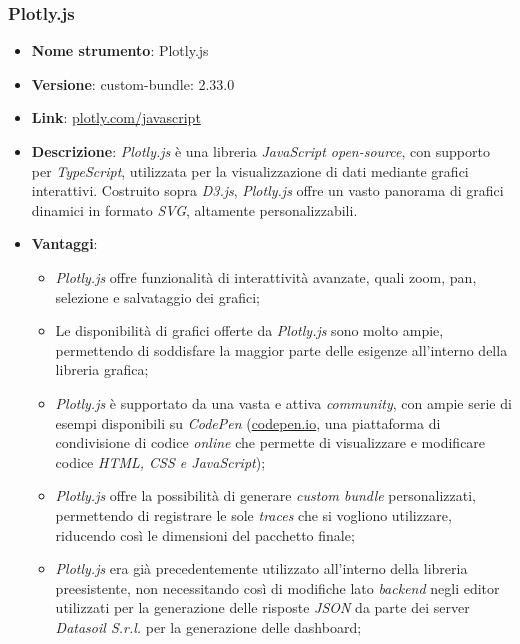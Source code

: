 \subsubsection{Plotly.js}
\begin{itemize}
    \item \textbf{Nome strumento}: Plotly.js
    \item \textbf{Versione}: custom-bundle: 2.33.0
    \item \textbf{Link}: \href{https://plotly.com/javascript/}{plotly.com/javascript}
    \item \textbf{Descrizione}: \textit{Plotly.js} è una libreria \textit{JavaScript open-source}, con supporto per \textit{TypeScript}, utilizzata per la visualizzazione di dati mediante grafici interattivi.
          Costruito sopra \textit{D3.js}, \textit{Plotly.js} offre un vasto panorama di grafici dinamici in formato \textit{\gls{SVG}\glox}, altamente personalizzabili.
    \item \textbf{Vantaggi}:
          \begin{itemize}
              \item \textit{Plotly.js} offre funzionalità di interattività avanzate, quali zoom, pan, selezione e salvataggio dei grafici;
              \item Le disponibilità di grafici offerte da \textit{Plotly.js} sono molto ampie, permettendo di soddisfare la maggior parte delle esigenze
                    all'interno della libreria grafica;
              \item \textit{Plotly.js} è supportato da una vasta e attiva \textit{community}, con ampie serie di esempi disponibili su \textit{CodePen} (\href{https://codepen.io/}{codepen.io}, una piattaforma di condivisione di codice
                    \textit{online} che permette di visualizzare e modificare codice \textit{HTML, CSS e JavaScript});
              \item \textit{Plotly.js} offre la possibilità di generare \textit{custom bundle} personalizzati, permettendo di registrare le sole \textit{traces} che si vogliono utilizzare, riducendo
                    così le dimensioni del pacchetto finale;
              \item \textit{Plotly.js} era già precedentemente utilizzato all'interno della libreria preesistente, non necessitando così di modifiche lato \textit{\gls{backend}\glox} negli editor
                    utilizzati per la generazione delle risposte \textit{JSON} da parte dei server \textit{Datasoil S.r.l.} per la generazione delle dashboard;

\end{itemize}
\end{itemize}
